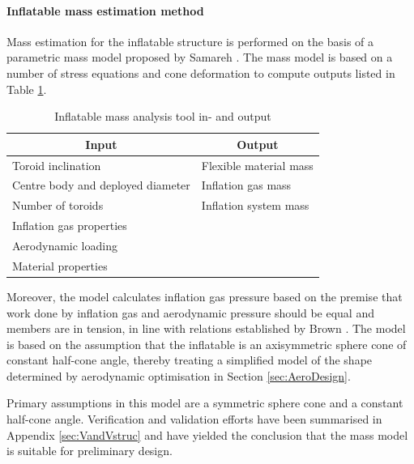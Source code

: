 \paragraph{Inflatable mass estimation method}

Mass estimation for the inflatable structure is performed on the basis of a parametric mass model proposed by Samareh \cite{Samareh2011}. The mass model is based on a number of stress equations and cone deformation to compute outputs listed in Table \ref{tab:inflmass}.
\begin{table}[ht]
\caption{Inflatable mass analysis tool in- and output}
\centering
\begin{tabular}{|l||l|}
\hline
\multicolumn{1}{|c||}{{\bf Input}} & \multicolumn{1}{c|}{{\bf Output}} \\ \hline \hline
Toroid inclination         & Flexible material mass            \\ \hline
Centre body and deployed diameter        & Inflation gas mass                 \\ \hline
Number of toroids                 & Inflation system mass                \\ \hline
Inflation gas properties              &              \\ \hline
Aerodynamic loading               &                                   \\ \hline
Material properties  &                                   \\ \hline
\end{tabular}
\label{tab:inflmass}
\end{table}
Moreover, the model calculates inflation gas pressure based on the premise that work done by inflation gas and aerodynamic pressure should be equal and members are in tension, in line with relations established by Brown \cite{Brown2009}. The model is based on the assumption that the inflatable is an axisymmetric sphere cone of constant half-cone angle, thereby treating a simplified model of the shape determined by aerodynamic optimisation in Section \ref{sec:AeroDesign}. 

Primary assumptions in this model are a symmetric sphere cone and a constant half-cone angle. Verification and validation efforts have been summarised in Appendix \ref{sec:VandVstruc} and have yielded the conclusion that the mass model is suitable for preliminary design.


